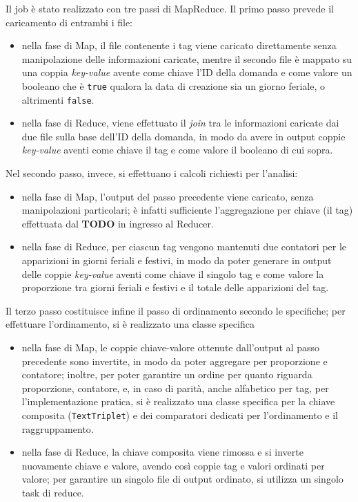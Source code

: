   Il job è stato realizzato con tre passi di MapReduce.
  Il primo passo prevede il caricamento di entrambi i file:
  \begin{itemize}
    \item
      nella fase di Map, il file contenente i tag viene caricato direttamente senza manipolazione delle informazioni caricate,
      mentre il secondo file è mappato su una coppia \textit{key-value} avente come chiave l'ID della domanda
      e come valore un booleano che è \texttt{true} qualora la data di creazione sia un giorno feriale, o altrimenti \texttt{false}.

    \item
      nella fase di Reduce, viene effettuato il \textit{join} tra le informazioni caricate dai due file sulla base dell'ID della domanda,
      in modo da avere in output coppie \textit{key-value} aventi come chiave il tag e come valore il booleano di cui sopra.
  \end{itemize}

  Nel secondo passo, invece, si effettuano i calcoli richiesti per l'analisi:
  \begin{itemize}
    \item
      nella fase di Map, l'output del passo precedente viene caricato, senza manipolazioni particolari;
      è infatti sufficiente l'aggregazione per chiave (il tag) effettuata dal \textbf{TODO} in ingresso al Reducer.

    \item
      nella fase di Reduce, per ciascun tag vengono mantenuti due contatori per le apparizioni in giorni feriali e festivi,
      in modo da poter generare in output delle coppie \textit{key-value} aventi come chiave il singolo tag e come valore la proporzione tra giorni feriali e festivi e il totale delle apparizioni del tag.
  \end{itemize}

  Il terzo passo costituisce infine il passo di ordinamento secondo le specifiche; per effettuare l'ordinamento, si è realizzato una classe specifica
  \begin{itemize}
    \item
      nella fase di Map, le coppie chiave-valore ottenute dall'output al passo precedente sono invertite, in modo da poter aggregare per proporzione e contatore;
      inoltre, per poter garantire un ordine per quanto riguarda proporzione, contatore, e, in caso di parità, anche alfabetico per tag,
      per l'implementazione pratica, si è realizzato una classe specifica per la chiave composita (\texttt{TextTriplet}) e dei comparatori dedicati per l'ordinamento e il raggruppamento.

    \item
      nella fase di Reduce, la chiave composita viene rimossa e si inverte nuovamente chiave e valore, avendo così coppie tag e valori ordinati per valore;
      per garantire un singolo file di output ordinato, si utilizza un singolo task di reduce.
  \end{itemize}

